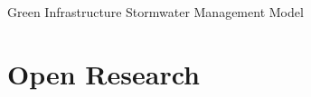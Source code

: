 \documentclass[draft]{agujournal2019}
\begin{document}

%
%
%
%

%
   \begin{acronyms}
   Green Infrastructure
   Stormwater Management Model
   \end{acronyms}

%




%
%
%
%
%
%


\section*{Open Research}

\end{document}
